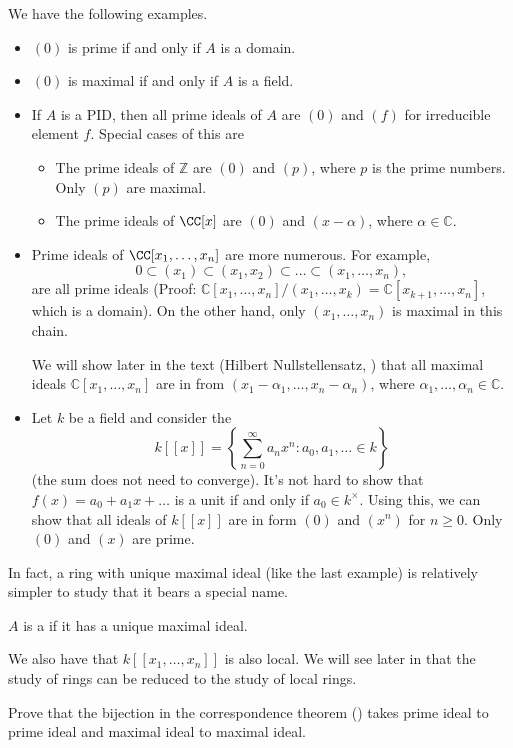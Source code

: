 \begin{example}
    We have the following examples.
    \begin{itemize}
    \item $(0)$ is prime if and only if $A$ is a domain.
    \item $(0)$ is maximal if and only if $A$ is a field.
    \item If $A$ is a PID, then all prime ideals of $A$ are 
    $(0)$ and $(f)$ for irreducible element $f$.
    Special cases of this are 
    \begin{itemize}
    \item The prime ideals of $\mathbb Z$
	are $(0)$ and $(p)$, where $p$ is the prime numbers.
	Only $(p)$ are maximal.
    \item The prime ideals of $\CC[x]$ are $(0)$ and 
    $(x-\alpha)$, where $\alpha\in\mathbb C$.
    \end{itemize}
    \item Prime ideals of $\CC[x_1,\dots,x_n]$ are more numerous. For example, 
    $$0\subset (x_1)\subset (x_1,x_2)\subset\dots
	\subset (x_1,\dots,x_n),$$
    are all prime ideals 
    (Proof: $\mathbb C[x_1,\dots,x_n]/(x_1,\dots,x_k)
    = \mathbb C[x_{k+1},\dots,x_n]$, which is a domain).
    On the other hand, only $(x_1,\dots,x_n)$
    is maximal in this chain.

    We will show later in the text (Hilbert Nullstellensatz, 
    ) that all maximal ideals
    $\mathbb C[x_1,\dots,x_n]$ are in from
    $(x_1-\alpha_1,\dots, x_n-\alpha_n)$,
    where $\alpha_1,\dots,\alpha_n\in\mathbb C$.
    \item Let $k$ be a field and consider the 
    $$k[[x]] = \left\{\sum_{n=0}^\infty
    a_n x^n : a_0,a_1,\dots \in k\right\}$$
    (the sum does not need to converge). 
    It's not hard to show that $f(x) = a_0 + a_1x + \dots$
    is a unit if and only if $a_0\in k^\times$.
    Using this, we can show that all ideals of $k[[x]]$
    are in form $(0)$ and $(x^n)$ for $n\geq 0$.
    Only $(0)$ and $(x)$ are prime.
    \end{itemize}
\end{example}
In fact, a ring with unique maximal ideal
(like the last example)
is relatively simpler to study that it bears a special name.
\begin{definition}
    $A$ is a  if it has
    a unique maximal ideal.
\end{definition}
We also have that $k[[x_1,\dots,x_n]]$ is also local.
We will see later in  that 
the study of rings can be reduced to the study of local rings.
\begin{exercise}
    Prove that the bijection in the correspondence theorem
    () takes prime ideal to prime ideal
    and maximal ideal to maximal ideal.
\end{exercise}
%
%
%
%
%
